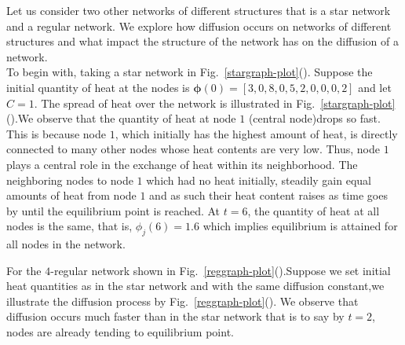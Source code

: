\documentclass[10pt,a4paper]{article}
\begin{document}
Let us consider two other networks of different structures that is a star network and a regular network. We explore how diffusion occurs on networks of different structures and what impact the structure of the network has on the diffusion of a network.\\
To begin with, taking a star network in Fig.~\ref{stargraph-plot}(). Suppose the initial quantity of heat at the nodes is $\boldsymbol{\phi}(0)=[3,0,8,0,5,2,0,0,0,2]$ and let $C=1$. The spread of heat over the network is illustrated in Fig.~\ref{stargraph-plot}().We observe that the quantity of heat at node $1$ (central node)drops so fast. This is because node $1$, which initially has the highest amount of heat, is directly connected to many other nodes whose heat contents are very low. Thus, node $1$ plays a central role in the exchange of heat within its neighborhood. The neighboring nodes to node $1$ which had no heat initially, steadily gain equal amounts of heat from node $1$ and as such their heat content raises as time goes by until the equilibrium point is reached. At $t=6$, the quantity of heat at all nodes is the same, that is, $\phi_j(6)= 1.6$ which implies equilibrium is attained for all nodes in the network.

For the $4$-regular network shown in Fig.~\ref{reggraph-plot}().Suppose we set initial heat quantities as in the star network and with the same diffusion constant,we illustrate the diffusion process by Fig.~\ref{reggraph-plot}(). We observe that diffusion occurs much faster than in the star network that is to say by $t=2$, nodes are already tending to equilibrium point.
\end{document}
